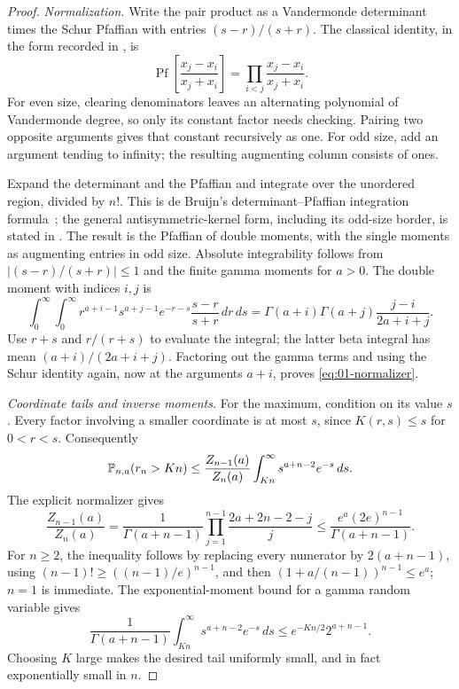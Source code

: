 \begin{proof}
\emph{Normalization.}
Write the pair product as a Vandermonde determinant times the Schur
Pfaffian with entries $(s-r)/(s+r)$. The classical identity, in the
form recorded in \cite[equation (1.2)]{IshikawaOkadaTagawaZeng2006}, is
\[
 \operatorname{Pf}\left[\frac{x_j-x_i}{x_j+x_i}\right]
 =\prod_{i<j}\frac{x_j-x_i}{x_j+x_i}.
\]
For even size, clearing denominators leaves an alternating
polynomial of Vandermonde degree, so only its constant factor needs
checking. Pairing two opposite arguments gives that constant
recursively as one. For odd size, add an argument tending to infinity;
the resulting augmenting column consists of ones.

Expand the determinant and the Pfaffian and integrate over the
unordered region, divided by $n!$. This is de Bruijn's
determinant--Pfaffian integration formula~\cite{deBruijn1955}; the
general antisymmetric-kernel form, including its odd-size border,
is stated in \cite[Theorem 6.1]{BaikRains2001Algebraic}. The result is
the Pfaffian of double moments, with the single moments as augmenting
entries in odd size. Absolute integrability follows from
$|(s-r)/(s+r)|\le1$ and the finite gamma moments for $a>0$.
The double moment with indices $i,j$ is
\[
 \int_0^\infty\!\int_0^\infty
 r^{a+i-1}s^{a+j-1}e^{-r-s}\frac{s-r}{s+r}\,dr\,ds
 =\Gamma(a+i)\Gamma(a+j)\frac{j-i}{2a+i+j}.
\]
Use $r+s$ and $r/(r+s)$ to evaluate the integral; the latter beta
integral has mean $(a+i)/(2a+i+j)$. Factoring out the gamma terms and
using the Schur identity again, now at the arguments $a+i$, proves
\eqref{eq:01-normalizer}.

\smallskip\noindent\emph{Coordinate tails and inverse moments.}
For the maximum, condition on its value $s$. Every factor involving
a smaller coordinate is at most $s$, since $K(r,s)\le s$ for
$0<r<s$. Consequently
\[
 \mathbb P_{n,a}(r_n>Kn)
 \le\frac{Z_{n-1}(a)}{Z_n(a)}
         \int_{Kn}^\infty s^{a+n-2}e^{-s}\,ds.
\]
The explicit normalizer gives
\[
 \frac{Z_{n-1}(a)}{Z_n(a)}
 =\frac1{\Gamma(a+n-1)}
   \prod_{j=1}^{n-1}\frac{2a+2n-2-j}{j}
 \le\frac{e^a(2e)^{n-1}}{\Gamma(a+n-1)}.
\]
For $n\ge2$, the inequality follows by replacing every numerator by
$2(a+n-1)$, using $(n-1)!\ge((n-1)/e)^{n-1}$, and then
$(1+a/(n-1))^{n-1}\le e^a$; $n=1$ is immediate. The exponential-moment bound for a gamma random
variable gives
\[
 \frac1{\Gamma(a+n-1)}\int_{Kn}^\infty s^{a+n-2}e^{-s}\,ds
 \le e^{-Kn/2}2^{a+n-1}.
\]
Choosing $K$ large makes the desired tail uniformly small, and in
fact exponentially small in $n$.


\end{proof}
